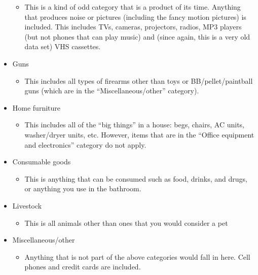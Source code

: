 \documentclass[
]{krantz}
\providecommand{\tightlist}{%
  \setlength{\itemsep}{0pt}\setlength{\parskip}{0pt}}
\begin{document}
\begin{itemize}
  \begin{itemize}
  \tightlist
  \item
    This is a kind of odd category that is a product of its
    time. Anything that produces noise or pictures
    (including the fancy motion pictures) is included. This
    includes TVs, cameras, projectors, radios, MP3 players
    (but not phones that can play music) and (since again,
    this is a very old data set) VHS cassettes.
  \end{itemize}
\item
  Guns

  \begin{itemize}
  \tightlist
  \item
    This includes all types of firearms other than toys or
    BB/pellet/paintball guns (which are in the
    ``Miscellaneous/other'' category).
  \end{itemize}
\item
  Home furniture

  \begin{itemize}
  \tightlist
  \item
    This includes all of the ``big things'' in a house:
    begs, chairs, AC units, washer/dryer units, etc.
    However, items that are in the ``Office equipment and
    electronics'' category do not apply.
  \end{itemize}
\item
  Consumable goods

  \begin{itemize}
  \tightlist
  \item
    This is anything that can be consumed such as food,
    drinks, and drugs, or anything you use in the bathroom.
  \end{itemize}
\item
  Livestock

  \begin{itemize}
  \tightlist
  \item
    This is all animals other than ones that you would
    consider a pet
  \end{itemize}
\item
  Miscellaneous/other

  \begin{itemize}
  \tightlist
  \item
    Anything that is not part of the above categories would
    fall in here. Cell phones and credit cards are included.
  \end{itemize}
\end{itemize}
\end{document}
